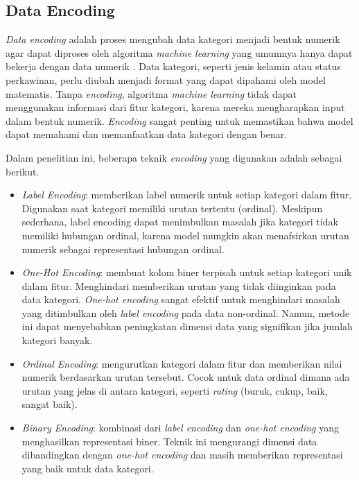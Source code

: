 \documentclass[conference]{IEEEtran}
\begin{document}
\subsection{Data Encoding}
\textit{Data encoding} adalah proses mengubah data kategori menjadi bentuk numerik agar dapat diproses oleh algoritma \textit{machine learning} yang umumnya hanya dapat bekerja dengan data numerik \cite{b36}. 
Data kategori, seperti jenis kelamin atau status perkawinan, perlu diubah menjadi format yang dapat dipahami oleh model matematis. Tanpa \textit{encoding}, algoritma \textit{machine learning} tidak dapat 
menggunakan informasi dari fitur kategori, karena mereka mengharapkan input dalam bentuk numerik. \textit{Encoding} sangat penting untuk memastikan bahwa model dapat memahami dan memanfaatkan 
data kategori dengan benar.

Dalam penelitian ini, beberapa teknik \textit{encoding} yang digunakan adalah sebagai berikut.

\begin{itemize}
    \item \textit{Label Encoding}: memberikan label numerik untuk setiap kategori dalam fitur. Digunakan saat kategori memiliki urutan tertentu (ordinal).
    Meskipun sederhana, label encoding dapat menimbulkan masalah jika kategori tidak memiliki hubungan ordinal, karena model mungkin akan menafsirkan urutan numerik sebagai representasi hubungan ordinal.
    \item \textit{One-Hot Encoding}: membuat kolom biner terpisah untuk setiap kategori unik dalam fitur. Menghindari memberikan urutan yang tidak diinginkan pada data kategori. 
    \textit{One-hot encoding} sangat efektif untuk menghindari masalah yang ditimbulkan oleh \textit{label encoding} pada data non-ordinal. Namun, metode ini dapat menyebabkan peningkatan dimensi data yang signifikan jika jumlah kategori banyak.
    \item \textit{Ordinal Encoding}: mengurutkan kategori dalam fitur dan memberikan nilai numerik berdasarkan urutan tersebut. Cocok untuk data ordinal dimana ada urutan yang jelas di antara kategori, seperti \textit{rating} (buruk, cukup, baik, sangat baik). 
    \item \textit{Binary Encoding}: kombinasi dari \textit{label encoding} dan \textit{one-hot encoding} yang menghasilkan representasi biner. Teknik ini mengurangi dimensi data dibandingkan dengan \textit{one-hot encoding} dan masih memberikan representasi yang baik untuk data kategori.
\end{itemize}
\end{document}
